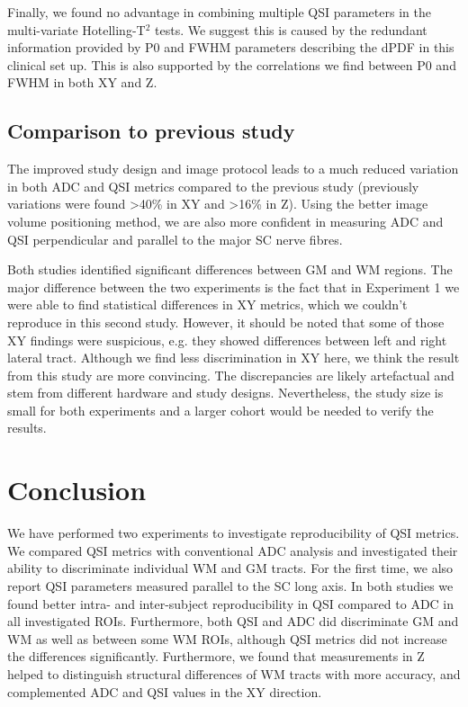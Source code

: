 Finally, we found no advantage in combining multiple QSI parameters in the multi-variate Hotelling-T$^2$ tests. We suggest this is caused by the redundant information provided by P0 and FWHM parameters describing the \gls{dPDF} in this clinical set up. This is also supported by the correlations we find between P0 and FWHM in both XY and Z.

\subsection{Comparison to previous study}
The improved study design and image protocol leads to a much reduced variation in both ADC and QSI metrics compared to the previous study (previously variations were found >40\% in XY and >16\% in Z). Using the better image volume positioning method, we are also more confident in measuring ADC and QSI perpendicular and parallel to the major \gls{SC} nerve fibres.

Both studies identified significant differences between GM and WM regions. The major difference between the two experiments is the fact that in Experiment 1 we were able to find statistical differences in XY metrics, which we couldn't reproduce in this second study. However, it should be noted that some of those XY findings were suspicious, e.g. they showed differences between left and right lateral tract. Although we find less discrimination in XY here, we think the result from this study are more convincing. The discrepancies are likely artefactual and stem from different hardware and study designs. Nevertheless, the study size is small for both experiments and a larger cohort would be needed to verify the results.
 
 

\section{Conclusion}
\label{par:chapter5 exp2 correlation}
We have performed two experiments to investigate reproducibility of QSI metrics. We compared QSI metrics with conventional ADC analysis and investigated their ability to discriminate individual WM and GM tracts. For the first time, we also report QSI parameters measured parallel to the \gls{SC} long axis. In both studies we found better intra- and inter-subject reproducibility in QSI compared to ADC in all investigated \glspl{ROI}. Furthermore, both QSI and ADC did discriminate GM and WM as well as between some WM \glspl{ROI}, although QSI metrics did not increase the differences significantly. Furthermore, we found that measurements in Z helped to distinguish structural differences of WM tracts with more accuracy, and complemented ADC and QSI values in the XY direction.


